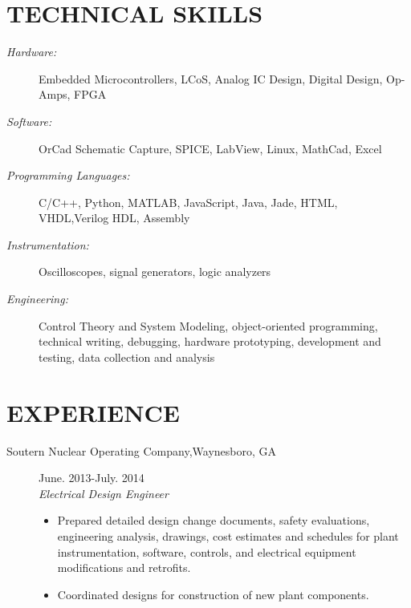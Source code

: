 \documentclass{res}
\begin{document}
 


\address{robert.savage3@gmail.com / (404)-434-3286 / \url{www.linkedin.com/in/robertmorgansavage/en}}


\begin{resume}
  

\section{TECHNICAL SKILLS}
	\begin{description}
	 	\item[\textit{Hardware:}] Embedded Microcontrollers, LCoS, Analog IC Design, Digital Design, Op-Amps, FPGA
   		\item [\textit{Software:}]  OrCad Schematic Capture, SPICE, LabView, Linux,  MathCad, Excel
   		\item[\textit{Programming Languages:}]C/C++, Python, MATLAB, JavaScript, Java, Jade, HTML, VHDL,Verilog HDL, Assembly 
   		\item[\textit{Instrumentation:}] Oscilloscopes, signal generators, logic analyzers
   		\item[\textit{Engineering:}]  Control Theory and System Modeling, object-oriented programming, technical writing, debugging, hardware prototyping, development and testing, data collection and analysis
    \end{description}
    
 \section{EXPERIENCE}
    	\begin{description}
    		\item[{Soutern Nuclear Operating Company},Waynesboro, GA]\hfill June. 2013-July. 2014\\\textit{Electrical Design Engineer}
    		\vspace{-0.1in} 
    		\begin{itemize}
    		   	\item Prepared detailed design change documents, safety evaluations, engineering analysis, drawings, cost estimates and schedules for plant instrumentation, software, controls, and electrical equipment modifications and retrofits.
    		   	\item Coordinated designs for construction of new plant components. 
    		\end{itemize}
    		

\end{description}
\end{resume}
\end{document}
